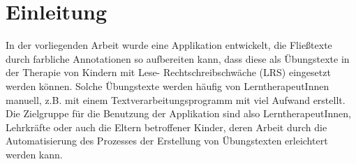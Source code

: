 
\chapter{Einleitung}

In der vorliegenden Arbeit wurde eine Applikation entwickelt, die Fließtexte durch farbliche Annotationen so aufbereiten kann, dass diese als Übungstexte in der Therapie von Kindern mit Lese- Rechtschreibschwäche (LRS) eingesetzt werden können. Solche Übungstexte werden häufig von LerntherapeutInnen manuell, z.B. mit einem Textverarbeitungsprogramm mit viel Aufwand erstellt. Die Zielgruppe für die Benutzung der Applikation sind also LerntherapeutInnen, Lehrkräfte oder auch die Eltern betroffener Kinder, deren Arbeit durch die Automatisierung des Prozesses der Erstellung von Übungstexten erleichtert werden kann.\\

